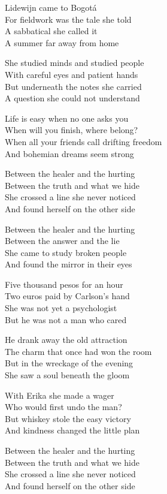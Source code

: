 \begin{lyrics}
Lidewijn came to Bogotá\\
For fieldwork was the tale she told\\
A sabbatical she called it\\
A summer far away from home

She studied minds and studied people\\
With careful eyes and patient hands\\
But underneath the notes she carried\\
A question she could not understand

Life is easy when no one asks you\\
When will you finish, where belong?\\
When all your friends call drifting freedom\\
And bohemian dreams seem strong

Between the healer and the hurting\\
Between the truth and what we hide\\
She crossed a line she never noticed\\
And found herself on the other side

Between the healer and the hurting\\
Between the answer and the lie\\
She came to study broken people\\
And found the mirror in their eyes

Five thousand pesos for an hour\\
Two euros paid by Carlson’s hand\\
She was not yet a psychologist\\
But he was not a man who cared

He drank away the old attraction\\
The charm that once had won the room\\
But in the wreckage of the evening\\
She saw a soul beneath the gloom

With Erika she made a wager\\
Who would first undo the man?\\
But whiskey stole the easy victory\\
And kindness changed the little plan

Between the healer and the hurting\\
Between the truth and what we hide\\
She crossed a line she never noticed\\
And found herself on the other side


\end{lyrics}
